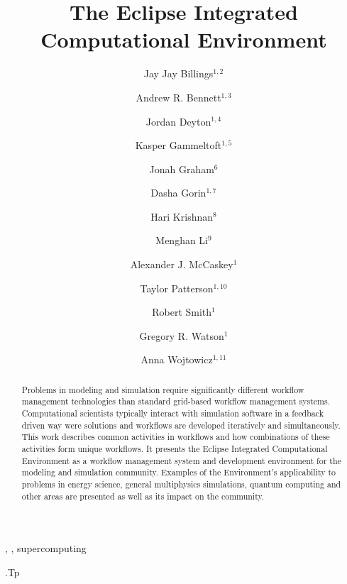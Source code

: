 \documentclass{elsart}
\begin{document}
\begin{frontmatter}

\title{The Eclipse Integrated Computational Environment}

\author{Jay Jay Billings$^{1,2}$}
\author{Andrew R. Bennett$^{1,3}$}
\author{Jordan Deyton$^{1,4}$}
\author{Kasper Gammeltoft$^{1,5}$}
\author{Jonah Graham$^{6}$}
\author{Dasha Gorin$^{1,7}$}
\author{Hari Krishnan$^{8}$}
\author{Menghan Li$^{9}$}
\author{Alexander J. McCaskey$^{1}$}
\author{Taylor Patterson$^{1,10}$}
\author{Robert Smith$^{1}$}
\author{Gregory R. Watson$^{1}$}
\author{Anna Wojtowicz$^{1,11}$}

\address{$^1$Computer Science and Mathematics Division, Oak Ridge National
Laboratory, Oak Ridge, TN 37830, USA}
\address{$^2$The Bredesen Center for Interdisciplinary Research and Graduate
Education, University of Tennessee, 444 Greve Hall, 821 Volunteer
  Blvd. Knoxville, TN 37996-3394}
\address{$^3$University of Washington, Seattle, WA 98105}
\address{$^4$General Electric Company, 3200 North Grandview Blvd Waukesha, WI
53188-1678}
\address{$^5$Georgia Institute of Technology North Avenue, Atlanta, GA 30332}
\address{$^6$Kichwa Coders Ltd. 1 Plomer Green Avenue Downley, High Wycombe
HP13 5LN United Kingdom}
\address{$^7$Northwestern University 633 Clark Street Evanston, IL 60208}
\address{$^8$Lawrence Berkeley National Laboratory, 1 Cyclotron Rd, Berkeley,
CA 94720}
\address{$^9$Department of Computer Science, and Department of Biological
Sciences, Purdue University, West Lafayette, IN 47906} 
\address{$^10$Acato Information Management, LLC 114 Union Valley Rd. Oak Ridge,
TN 37830}
\address{$^11$Colorado State University Fort Collins, CO 80523}

\begin{abstract}

Problems in modeling and simulation require significantly different
workflow management technologies than standard grid-based workflow
management systems. Computational scientists typically interact with
simulation software in a feedback driven way were solutions and
workflows are developed iteratively and simultaneously. This work
describes common activities in workflows and how combinations of these
activities form unique workflows. It presents the Eclipse Integrated
Computational Environment as a workflow management system and
development environment for the modeling and simulation community.
Examples of the Environment's applicability to problems in energy
science, general multiphysics simulations, quantum computing and other
areas are presented as well as its impact on the community.

\end{abstract}

\begin{keyword}
\sep 
\sep 
supercomputing

\vspace{1ex}

.Tp %

\end{keyword}

\end{frontmatter}
\end{document}
